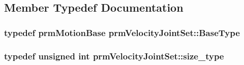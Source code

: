 \subsection{Member Typedef Documentation}
\hypertarget{classprm_velocity_joint_set_a8cd5faa63ec2682c605ca6c6e1248f3a}{
\subsubsection[{Base\-Type}]{\setlength{\rightskip}{0pt plus 5cm}typedef {\bf prm\-Motion\-Base} {\bf prm\-Velocity\-Joint\-Set\-::\-Base\-Type}}}\label{classprm_velocity_joint_set_a8cd5faa63ec2682c605ca6c6e1248f3a}
\hypertarget{classprm_velocity_joint_set_a48434c7a4127357203c7cff1e6f2a429}{
\subsubsection[{size\-\_\-type}]{\setlength{\rightskip}{0pt plus 5cm}typedef unsigned int {\bf prm\-Velocity\-Joint\-Set\-::size\-\_\-type}}}\label{classprm_velocity_joint_set_a48434c7a4127357203c7cff1e6f2a429}


